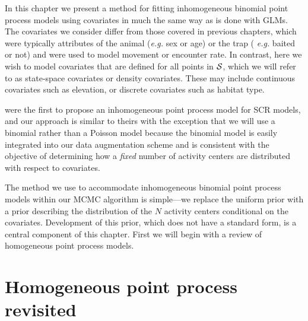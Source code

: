 In this chapter we present a method
for fitting inhomogeneous binomial point process models using
covariates in much the same way as is done with GLMs. The
covariates we consider differ
from those covered in previous chapters, which were typically
attributes of the animal ({\it e.g.} sex or age) or the trap ({\it
  e.g.} baited or not) and were used to model movement or encounter
rate. In contrast, here we wish to
model covariates that are defined for all points in
$\cal{S}$, which we will refer to as
state-space covariates or density covariates. These may
include continuous covariates such as elevation, or discrete
covariates such as habitat type.

\citet{borchers_efford:2008} were the first to propose an
inhomogeneous point process model for SCR models, and our approach is
similar to theirs with the exception that we will use a binomial
rather than a Poisson model because the binomial model is
easily integrated into our data augmentation scheme and is consistent
with the objective of determining how a {\it fixed} number of activity
centers are distributed with respect to covariates.

The method we use to accommodate inhomogeneous binomial point process
models within our MCMC algorithm is simple---we
replace the uniform prior with a prior describing the
distribution of the $N$ activity centers conditional on the
covariates. Development of this prior, which does not have a
standard form, is a central component of this chapter. First we will
begin with a review of homogeneous point process models.


\section{Homogeneous point process revisited}

